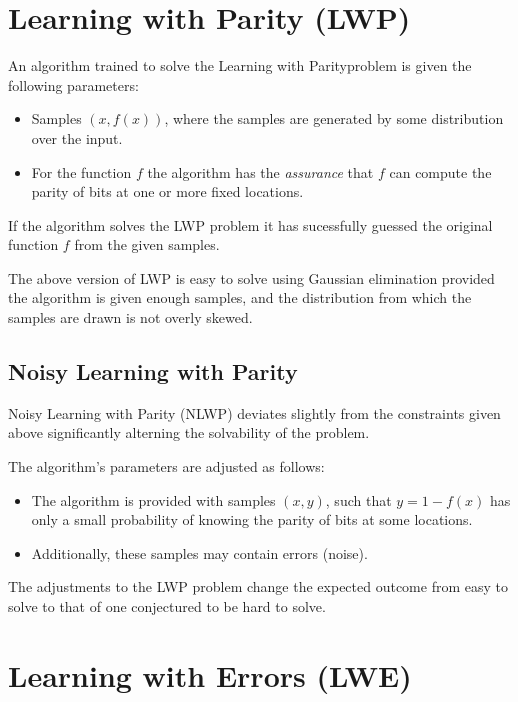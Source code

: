 \section{Learning with Parity (LWP)}


An algorithm trained to solve the Learning with Parityproblem is given the following parameters:
\begin{itemize}
	\item Samples $(x, f(x))$, where the samples are generated by some distribution over the input.
	\item For the function $f$ the algorithm has the \emph{assurance} that $f$ can compute the parity of bits at one or more fixed locations.
\end{itemize}

If the algorithm solves the LWP problem it has sucessfully guessed the original function $f$ from the given samples.

The above version of LWP is easy to solve using Gaussian elimination provided the algorithm is given enough samples, and the distribution from which the samples are drawn is not overly skewed. 

\subsection{Noisy Learning with Parity}

Noisy Learning with Parity (NLWP) deviates slightly from the constraints given above significantly alterning the solvability of the problem. 

The algorithm's parameters are adjusted as follows:
\begin{itemize}
	\item The algorithm is provided with samples $(x,y)$, such that $y = 1- f(x)$ has only a small probability of knowing the parity of bits at some locations. 
	\item Additionally, these samples may contain errors (noise).
\end{itemize}

The adjustments to the LWP problem change the expected outcome from easy to solve to that of one conjectured to be hard to solve. 

\section{Learning with Errors (LWE)}

